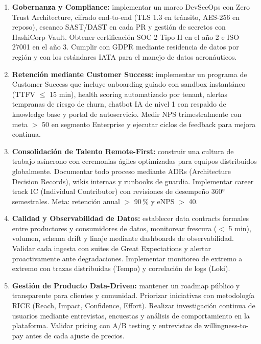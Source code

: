 ﻿\documentclass[11pt, letterpaper]{article}
\begin{document}
\begin{enumerate}[leftmargin=1.5cm, label=\textbf{OE\arabic*}, itemsep=2pt, topsep=4pt]
    \item \textbf{Gobernanza y Compliance:} implementar un marco DevSecOps con Zero Trust Architecture, cifrado end-to-end (TLS 1.3 en tránsito, AES-256 en reposo), escaneo SAST/DAST en cada PR y gestión de secretos con HashiCorp Vault. Obtener certificación SOC 2 Tipo II en el año 2 e ISO 27001 en el año 3. Cumplir con GDPR mediante residencia de datos por región y con los estándares IATA para el manejo de datos aeronáuticos.



    \item \textbf{Retención mediante Customer Success:} implementar un programa de Customer Success que incluye onboarding guiado con sandbox instantáneo (TTFV $\leq$ 15 min), health scoring automatizado por tenant, alertas tempranas de riesgo de churn, chatbot IA de nivel 1 con respaldo de knowledge base y portal de autoservicio. Medir NPS trimestralmente con meta $>$ 50 en segmento Enterprise y ejecutar ciclos de feedback para mejora continua.



    \item \textbf{Consolidación de Talento Remote-First:} construir una cultura de trabajo asíncrono con ceremonias ágiles optimizadas para equipos distribuidos globalmente. Documentar todo proceso mediante ADRs (Architecture Decision Records), wikis internas y runbooks de guardia. Implementar career track IC (Individual Contributor) con revisiones de desempeño 360° semestrales. Meta: retención anual $>$ 90\,\% y eNPS $>$ 40.



    \item \textbf{Calidad y Observabilidad de Datos:} establecer data contracts formales entre productores y consumidores de datos, monitorear frescura ($<$ 5 min), volumen, schema drift y linaje mediante dashboards de observabilidad. Validar cada ingesta con suites de Great Expectations y alertar proactivamente ante degradaciones. Implementar monitoreo de extremo a extremo con trazas distribuidas (Tempo) y correlación de logs (Loki).



    \item \textbf{Gestión de Producto Data-Driven:} mantener un roadmap público y transparente para clientes y comunidad. Priorizar iniciativas con metodología RICE (Reach, Impact, Confidence, Effort). Realizar investigación continua de usuarios mediante entrevistas, encuestas y análisis de comportamiento en la plataforma. Validar pricing con A/B testing y entrevistas de willingness-to-pay antes de cada ajuste de precios.

\end{enumerate}
\end{document}
